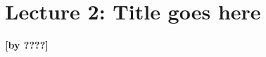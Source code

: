 
\section{Lecture 2: Title goes here}\label{sec:lecture2}
\begin{flushright}\textbf{[by ????]}\end{flushright}

